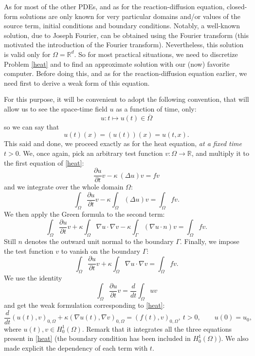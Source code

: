 \documentclass{article}
\begin{document}
As for most of the other PDEs, and as for the reaction-diffusion equation, closed-form solutions are only known for very particular domains and/or values of the source term, initial conditions and boundary conditions. Notably, a well-known solution, due to Joseph Fourier, can be obtained using the Fourier transform (this motivated the introduction of the Fourier transform). Nevertheless, this solution is valid only for $\Omega=\mathbb{R}^d$. So for most practical situations, we need to discretize Problem \eqref{heat} and to find an approximate solution with our (now) favorite computer. Before doing this, and as for the reaction-diffusion equation earlier, we need first to derive a weak form of this equation.

For this purpose, it will be convenient to adopt the following convention, that will allow us to see the space-time field $u$ as a function of time, only:
\[
u : t \mapsto u(t) \in \overline{\Omega}
\]
so we can say that
\[
u(t)(x) = (u(t))(x) = u(t,x).
\]
This said and done, we proceed exactly as for the heat equation, \emph{at a fixed time} $t>0$.
We, once again, pick an arbitrary {test function} $v : \Omega \rightarrow \mathbb{R}$, and multiply it to the first equation of \eqref{heat}:
\[
\frac{\partial u}{\partial t} v - \kappa\ (\Delta u) v = f v
\]
and we integrate over the whole domain $\Omega$:
\[
\int_\Omega \frac{\partial u}{\partial t} v - \kappa \int_\Omega (\Delta u) v = \int_\Omega f v.
\]
We then apply the Green formula to the second term:
\[
\int_\Omega \frac{\partial u}{\partial t} v
+ \kappa \int_\Omega \nabla u \cdot \nabla v - \kappa \int_\Gamma (\nabla u \cdot n) v = \int_\Omega f v.
\]
Still $n$ denotes the outward unit normal to the boundary $\Gamma$. Finally, we impose the test function $v$ to vanish on the boundary $\Gamma$: 
\[
\int_\Omega \frac{\partial u}{\partial t} v
+ \kappa \int_\Omega \nabla u \cdot \nabla v = \int_\Omega f v.
\]
We use the identity
\[
\int_\Omega \frac{\partial u}{\partial t} v
=
\frac{d}{dt} \int_\Omega u v
\]
and get the weak formulation corresponding to \eqref{heat}:
\begin{equation}
    \label{weakheat}
    \frac{d}{dt} (u(t),v)_{0,\Omega} 
    + \kappa (\nabla u(t), \nabla v)_{0,\Omega} = (f(t),v)_{0,\Omega}, \ t>0, \qquad u(0) = u_0,
\end{equation}
where $u(t), v \in H^1_0(\Omega)$. Remark that it integrates all the three equations present in \eqref{heat} (the boundary condition has been included in $H^1_0(\Omega)$). We also made explicit the dependency of each term with $t$.
\end{document}
